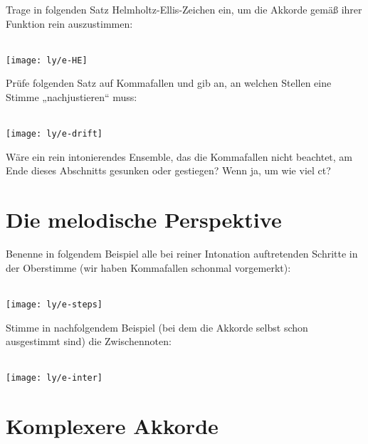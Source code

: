 \documentclass[ngerman,11pt]{scrartcl}
\begin{document}
\begin{aufg}
  Trage in folgenden Satz Helmholtz-Ellis-Zeichen ein, um die Akkorde gemäß
  ihrer Funktion rein auszustimmen:
  \begin{center}
    \\[-\baselineskip]
    \texttt{[image: ly/e-HE]}
  \end{center}
\end{aufg}

\wrap{\enlargethispage{\baselineskip}}

\begin{aufg}
  Prüfe folgenden Satz auf Kommafallen und gib an, an welchen Stellen eine
  Stimme „nachjustieren“ muss:
  \begin{center}
    \\[-\baselineskip]
    \texttt{[image: ly/e-drift]}
  \end{center}
  Wäre ein rein intonierendes Ensemble, das die Kommafallen nicht beachtet, am
  Ende dieses Abschnitts gesunken oder gestiegen? Wenn ja, um wie viel ct?
\end{aufg}

\section{Die melodische Perspektive}

\begin{aufg}
  Benenne in folgendem Beispiel alle bei reiner Intonation auftretenden Schritte
  in der Oberstimme (wir haben Kommafallen schonmal vorgemerkt):
  \begin{center}
    \\[-\baselineskip]
    \texttt{[image: ly/e-steps]}
  \end{center}%
\end{aufg}

\begin{aufg}
  Stimme in nachfolgendem Beispiel (bei dem die Akkorde selbst schon ausgestimmt
  sind) die Zwischennoten:
  \begin{center}
    \\[-\baselineskip]
    \texttt{[image: ly/e-inter]}
  \end{center}%
\end{aufg}

\section{Komplexere Akkorde}
\end{document}
